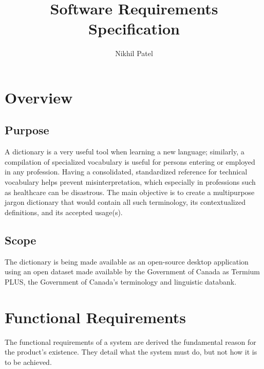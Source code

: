 \documentclass[11pt]{article} %
\title{Software Requirements Specification}
\author{Nikhil Patel}
\begin{document}
\maketitle

\section{Overview}

\subsection{Purpose}
A dictionary is a very useful tool when learning a new language; similarly, a compilation of 
specialized vocabulary is useful for persons entering or employed in any profession. Having a 
consolidated, standardized reference for technical vocabulary helps prevent misinterpretation, 
which especially in professions such as healthcare can be disastrous. The main objective is to 
create a multipurpose jargon dictionary that would contain all such terminology, its 
contextualized definitions, and its accepted usage(s).
\subsection{Scope}
The dictionary is being made available as an open-source desktop application using an open dataset made available by the Government of Canada as Termium PLUS\textsuperscript{\textregistered}, the Government of Canada's terminology and linguistic databank\cite{termium}.

\section{Functional Requirements}

The functional requirements of a system are derived the fundamental reason for the product's existence. They detail what the system must do, but not how it is to be achieved.
\end{document}
